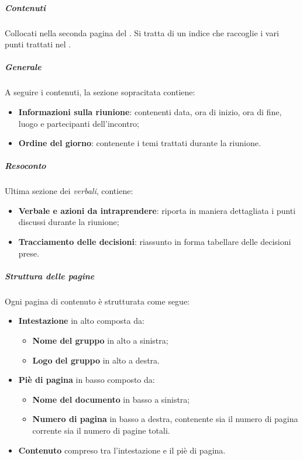           \subparagraph{Contenuti}
          Collocati nella seconda pagina del \docNameVLow{}. Si tratta di un indice che raccoglie i vari punti trattati nel \docNameVLow{}.

          \subparagraph{Generale}
          A seguire i contenuti, la sezione sopracitata contiene:
          \begin {itemize}
    \item \textbf{Informazioni sulla riunione}: contenenti data, ora di inizio, ora di fine, luogo e partecipanti dell'incontro;
    \item \textbf{Ordine del giorno}: contenente i temi trattati durante la riunione.
          \end {itemize}

          \subparagraph{Resoconto}
          Ultima sezione dei \textit{verbali}, contiene:
          \begin{itemize}
              \item \textbf{Verbale e azioni da intraprendere}: riporta in maniera dettagliata i punti discussi durante la riunione;
              \item \textbf{Tracciamento delle decisioni}: riassunto in forma tabellare delle decisioni prese.
          \end{itemize}

          \subparagraph{Struttura delle pagine}
          Ogni pagina di contenuto è strutturata come segue:
          \begin {itemize}
    \item \textbf{Intestazione} in alto composta da:
          \begin {itemize}
    \item \textbf{Nome del gruppo} in alto a sinistra;
    \item \textbf{Logo del gruppo} in alto a destra.
\end{itemize}
\item \textbf{Piè di pagina} in basso composto da:
\begin{itemize}
\item \textbf{Nome del documento} in basso a sinistra;
\item \textbf{Numero di pagina} in basso a destra, contenente sia il numero di pagina corrente sia il numero di pagine totali.
\end {itemize}
\item \textbf{Contenuto} compreso tra l'intestazione e il piè di pagina.
\end {itemize}




